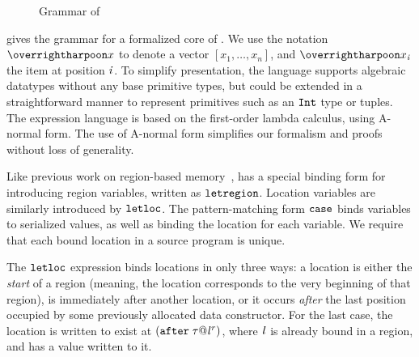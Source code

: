 \documentclass[showabstract,showacknowledgments,showpreface,showdedication]{iuphd}
\theoremstyle{nonumberplain}
\begin{document}
\begin{figure}
  
  \caption{Grammar of \ourcalc{}}
  \label{fig:grammar}  
\end{figure}

 gives the grammar for a formalized core of \ourcalc{}.
%
We use the notation $\overharpoon{x}$ to denote a vector $[
x_1, \ldots, x_n]$, and $\overharpoon{x_{\ind}}$ the item at position
$\mathit{i}$.
%
To simplify presentation, the language supports 
algebraic datatypes without any base primitive types, but could be extended in a straightforward
manner to represent primitives such as an $\texttt{Int}$ type or tuples.
%
The expression language is based on the first-order lambda calculus,
using A-normal form.
%
The use of A-normal form simplifies our formalism and proofs
without loss of generality.

Like previous work on region-based memory~\cite{regioncalcs},
\ourcalc{} has a special binding
form for introducing region variables, written as
$\texttt{letregion}$.
%
Location variables are similarly introduced by $\texttt{letloc}$.
%
The pattern-matching form $\texttt{case}$ binds variables to
serialized values, as well as binding the location for each variable.
%
We require that each bound location in
a source program is unique.
%

The $\texttt{letloc}$ expression binds locations in only three ways:
a location is either the \emph{start} of a region (meaning, the
location corresponds to the very beginning of that region), is
immediately after another location, or it occurs \emph{after} the last
position occupied by some previously allocated data constructor.
%
For the last case, the location is written to exist at
$(\texttt{after}\; \mathit{\tau} @ {\mathit{l}}^{\mathit{r}})$, where $\mathit{l}$ is already
bound in a region, and has a value written to it.

\end{document}
